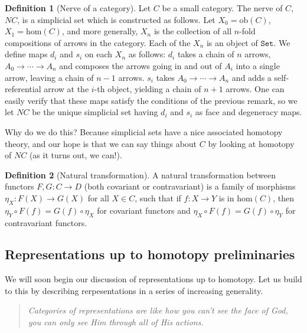 \documentclass[aps,pra,showpacs,notitlepage,onecolumn,superscriptaddress,nofootinbib]{revtex4-1}
\theoremstyle{definition}
\newtheorem{definition}{Definition}[section]
\begin{document}
\begin{definition}[Nerve of a category]
    Let $C$ be a small category. The nerve of $C$, $NC$, is a simplicial set which is constructed as follows. Let $X_0 = \text{ob}(C)$, $X_1 = \text{hom}(C)$, and more generally, $X_n$ is the collection of all $n$-fold compositions 
    of arrows in the category. Each of the $X_n$ is an object of $\texttt{Set}$. We define maps $d_i$ and $s_i$ on each $X_n$ as follows: $d_i$ takes a chain of $n$ arrows, $A_0 \rightarrow \cdots \rightarrow A_n$ and composes the 
    arrows going in and out of $A_i$ into a single arrow, leaving a chain of $n - 1$ arrows. $s_i$ takes $A_0 \rightarrow \cdots \rightarrow A_n$ and adds a self-referential arrow at the $i$-th object, yielding a chain of $n + 1$ arrows.
    One can easily verify that these maps satisfy the conditions of the previous remark, so we let $NC$ be the unique simplicial set having $d_i$ and $s_i$ as face and degeneracy maps.

    Why do we do this? Because simplicial sets have a nice associated homotopy theory, and our hope is that we can say things about $C$ by looking at homotopy of $NC$ (as it turns out, we can!).
\end{definition}

\begin{definition}[Natural transformation]
    A natural transformation between functors $F, G : C \rightarrow D$ (both covariant or contravariant) is a family of morphisms $\eta_X : F(X) \rightarrow G(X)$ for all $X \in C$, such that if $f : X \rightarrow Y$ is in $\text{hom}(C)$, 
    then $\eta_Y \circ F(f) = G(f) \circ \eta_X$ for covariant functors and $\eta_X \circ F(f) = G(f) \circ \eta_Y$ for contravariant functors.
\end{definition}

\subsection{Representations up to homotopy preliminaries}

\noindent We will soon begin our discussion of representations up to homotopy. Let us build to this by describing rerpesentations in a series of increasing generality.

\begin{quote}
    \emph{Categories of representations are like how you can't see the face of God, you can only see Him through all of His actions.} 
\end{quote}
\end{document}
